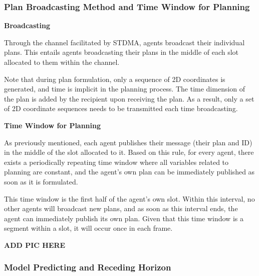 \subsubsection{Plan Broadcasting Method and Time Window for Planning}

\textbf{Broadcasting}

Through the channel facilitated by STDMA, agents broadcast their individual plans. This entails agents broadcasting their plans in the middle of each slot allocated to them within the channel.

Note that during plan formulation, only a sequence of 2D coordinates is generated, and time is implicit in the planning process. The time dimension of the plan is added by the recipient upon receiving the plan.
As a result, only a set of 2D coordinate sequences needs to be transmitted each time broadcasting.



\textbf{Time Window for Planning}

As previously mentioned, each agent publishes their message (their plan and ID) in the middle of the slot allocated to it.
Based on this rule, for every agent, there exists a periodically repeating time window where all variables related to planning are constant, 
and the agent's own plan can be immediately published as soon as it is formulated.

This time window is the first half of the agent's own slot. Within this interval, no other agents will broadcast new plans, and as soon as this interval ends, the agent can immediately publish its own plan.
Given that this time window is a segment within a slot, it will occur once in each frame. 

\textbf{ADD PIC HERE}%

\subsubsection{Model Predicting and Receding Horizon}

